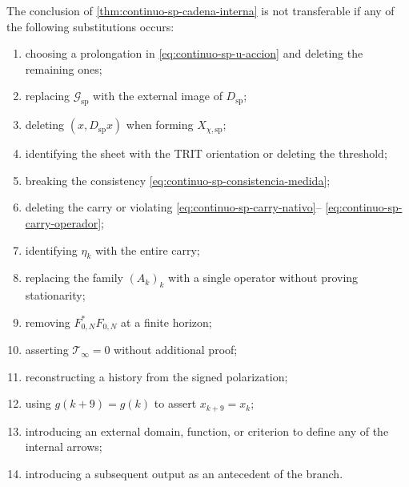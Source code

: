 \begin{proposition}
\label{prop:continuo-sp-falsadores}
The conclusion of
\cref{thm:continuo-sp-cadena-interna} is not transferable if any
of the following substitutions occurs:
\begin{enumerate}
 \item choosing a prolongation in
       \eqref{eq:continuo-sp-u-accion} and deleting the remaining ones;
 \item replacing \(\mathcal G_{\mathrm{sp}}\) with the external image of
       \(D_{\mathrm{sp}}\);
 \item deleting \((x,D_{\mathrm{sp}}x)\) when forming
       \(X_{\chi,\mathrm{sp}}\);
 \item identifying the sheet with the TRIT orientation or deleting the threshold;
 \item breaking the consistency
       \eqref{eq:continuo-sp-consistencia-medida};
 \item deleting the carry or violating
       \eqref{eq:continuo-sp-carry-nativo}--
       \eqref{eq:continuo-sp-carry-operador};
 \item identifying \(\eta_k\) with the entire carry;
 \item replacing the family \((A_k)_k\) with a single operator without proving
       stationarity;
 \item removing \(F_{0,N}^*F_{0,N}\) at a finite horizon;
 \item asserting \(\mathcal T_\infty=0\) without additional proof;
 \item reconstructing a history from the signed polarization;
 \item using \(g(k+9)=g(k)\) to assert \(x_{k+9}=x_k\);
 \item introducing an external domain, function, or criterion to
define any of the internal arrows;
 \item introducing a subsequent output as an antecedent of the branch.
\end{enumerate}
\end{proposition}
\fi
